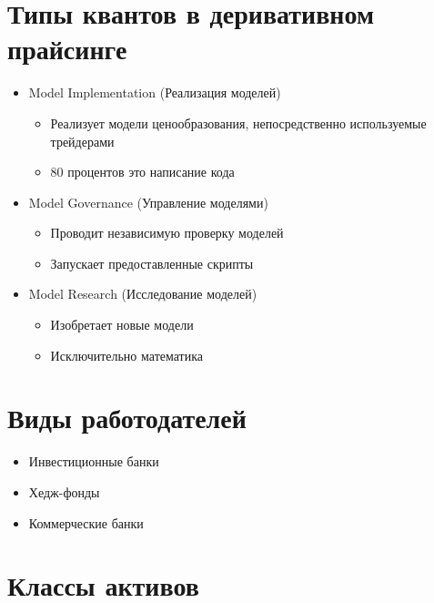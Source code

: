 \documentclass{article}
\begin{document}
\section{Типы квантов в деривативном прайсинге}
\begin{itemize}

  \item Model Implementation (Реализация моделей)
  
    \begin{itemize}
    \item Реализует модели ценообразования, непосредственно используемые трейдерами
    \item 80 процентов это написание кода
    \end{itemize}
   
   
  \item Model Governance (Управление моделями)
  
    \begin{itemize}
    \item Проводит независимую проверку моделей
    \item Запускает предоставленные скрипты
    \end{itemize}
   
  \item Model Research (Исследование моделей)


    \begin{itemize}
    \item Изобретает новые модели
    \item Исключительно математика
    \end{itemize}
    
\end{itemize}

\section{Виды работодателей}

\begin{itemize}
    \item Инвестиционные банки
    \item Хедж-фонды
    \item Коммерческие банки
\end{itemize}

\section{Классы активов}
\end{document}

